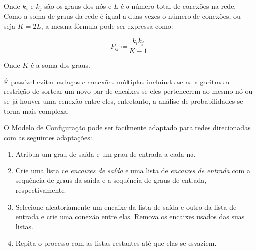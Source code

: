 \documentclass[12pt,a4paper]{article}
\theoremstyle{hypo}
\newcommand{\defn}{\coloneqq} %
\begin{document}

Onde $k_i$ e $k_j$ são os graus dos nós e $L$ é o número total de conexões na rede. Como a soma de graus da rede é igual a duas vezes o número de conexões, ou seja $K = 2L$, a mesma fórmula pode ser expressa como:

\begin{equation}
P_{ij} \defn \frac{k_i k_j}{K - 1}
\end{equation}

Onde $K$ é a soma dos graus.

É possível evitar os laços e conexões múltiplas incluindo-se no algoritmo a restrição de sortear um novo par de encaixes se eles pertencerem ao mesmo nó ou se já houver uma conexão entre eles, entretanto, a análise de probabilidades se torna mais complexa.

O Modelo de Configuração pode ser facilmente adaptado para redes direcionadas com as seguintes adaptações:


\begin{enumerate}
\item Atribua um grau de saída e um grau de entrada a cada nó.
\item Crie uma lista de \textit{encaixes de saída} e uma lista de \textit{encaixes de entrada} com a sequência de graus da saída e a sequência de graus de entrada, respectivamente.
\item Selecione aleatoriamente um encaixe da lista de saída e outro da lista de entrada e crie uma conexão entre elas. Remova os encaixes usados das suas listas.
\item Repita o processo com as listas restantes até que elas se esvaziem.
\end{enumerate}
\end{document}
